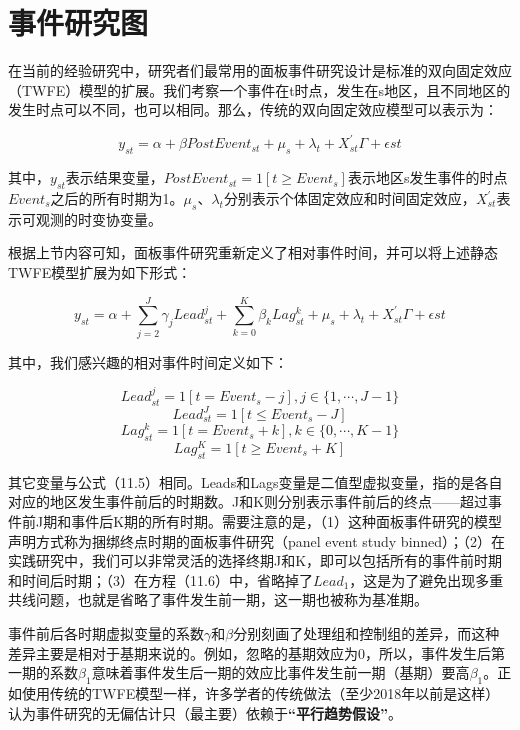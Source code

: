 \documentclass[cn,12pt,math=newtx,citestyle=gb7714-2015,bibstyle=gb7714-2015]{elegantbook}
\begin{document}
	    
	    \section{事件研究图}
	    
	    在当前的经验研究中，研究者们最常用的面板事件研究设计是标准的双向固定效应（TWFE）模型的扩展。我们考察一个事件在t时点，发生在s地区，且不同地区的发生时点可以不同，也可以相同。那么，传统的双向固定效应模型可以表示为：
	    
	    \begin{equation}
	    	y_{st}=\alpha+\beta PostEvent_{st}+\mu_s +\lambda_t +X_{st}^{'} \Gamma +\epsilon{st}
	    \end{equation}
	    
	    其中，$y_{st}$表示结果变量，$PostEvent_{st}=1[t\ge Event_s]$表示地区s发生事件的时点$Event_s$之后的所有时期为1。$\mu_s 、\lambda_t$分别表示个体固定效应和时间固定效应，$X_{st}^{'} $表示可观测的时变协变量。
	    
	    根据上节内容可知，面板事件研究重新定义了相对事件时间，并可以将上述静态TWFE模型扩展为如下形式：
	    
	     \begin{equation}
	    	y_{st}=\alpha+\sum_{j=2}^J \gamma_j Lead_{st}^j +\sum_{k=0}^K \beta_k Lag_{st}^k +\mu_s +\lambda_t +X_{st}^{'} \Gamma +\epsilon{st}
	    \end{equation}
	    
	    其中，我们感兴趣的相对事件时间定义如下：
	    
	    
	    	$$Lead_{st}^j=1[t=Event_s-j], j \in \{1,\cdots,J-1\} $$
	    $$	Lead_{st}^J=1[t\le Event_s-J]$$
	    		$$Lag_{st}^k=1[t=Event_s+k], k \in \{0,\cdots,K-1\} $$
	    	$$	Lag_{st}^K=1[t\ge Event_s+K]$$
	    	
	  其它变量与公式（11.5）相同。Leads和Lags变量是二值型虚拟变量，指的是各自对应的地区发生事件前后的时期数。J和K则分别表示事件前后的终点——超过事件前J期和事件后K期的所有时期。需要注意的是，（1）这种面板事件研究的模型声明方式称为捆绑终点时期的面板事件研究（panel event study binned）；（2）在实践研究中，我们可以非常灵活的选择终期J和K，即可以包括所有的事件前时期和时间后时期；（3）在方程（11.6）中，省略掉了$Lead_1$，这是为了避免出现多重共线问题，也就是省略了事件发生前一期，这一期也被称为基准期。
	  
	  事件前后各时期虚拟变量的系数$\gamma$和$\beta$分别刻画了处理组和控制组的差异，而这种差异主要是相对于基期来说的。例如，忽略的基期效应为0，所以，事件发生后第一期的系数$\beta_1$意味着事件发生后一期的效应比事件发生前一期（基期）要高$\beta_1$。正如使用传统的TWFE模型一样，许多学者的传统做法（至少2018年以前是这样）认为事件研究的无偏估计只（最主要）依赖于\textbf{“平行趋势假设”}。
	  
\end{document}
